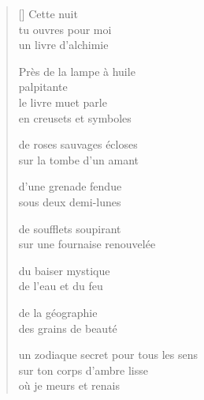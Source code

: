 \documentclass[12pt,a4paper]{article}
\begin{document}
\begin{verse}[\versewidth]
  Cette nuit \\
  tu ouvres pour moi \\
  un livre d'alchimie

  Près de la lampe à huile \\
  palpitante \\
  le livre muet parle \\
  en creusets et symboles

  de roses sauvages écloses \\
  sur la tombe d'un amant

  d'une grenade fendue \\
  sous deux demi-lunes

  de soufflets soupirant \\
  sur une fournaise renouvelée

  du baiser mystique \\
  de l'eau et du feu

  de la géographie \\
  des grains de beauté

  un zodiaque secret pour tous les sens \\
  sur ton corps d'ambre lisse \\
  où je meurs et renais
\end{verse}


\newpage

\poemtitle{}

\settowidth{\versewidth}{mon haleine faisant descendre un frisson}

\bigskip
\end{document}
